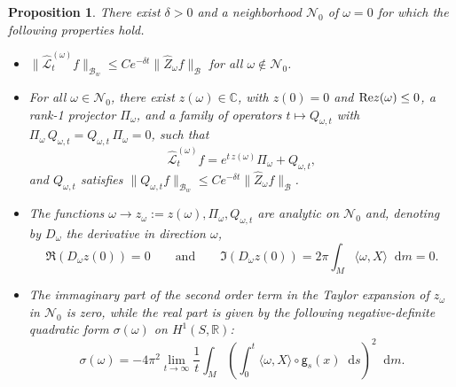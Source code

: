\documentclass[11pt,letterpaper]{amsart}
\newcommand \cL {{\mathcal L}}
\def\C{{\mathbb C}}
\newcommand \cB {{\mathscr B}}
\newcommand{\geo}{\mathsf{g}}
\newcommand*{\diff}{\mathop{}\!\mathrm{d}}
\newcommand \re {{%
\operatorname{Re}
}}
\newtheorem {proposition}[theorem]{Proposition}
\theoremstyle{definition}
\begin{document}
  \begin{proposition}\label{prop:pert2}
  	There exist $\delta > 0$ and a neighborhood $\mathcal N_0$ of $\omega=0$ for which the following properties hold.
  	\begin{itemize}
	\item[(A)] $\|\hat\cL^{(\omega)}_t f\|_{\cB_w} \leq C e^{-\delta t} \|\hat Z_{\omega} f\|_{\cB} $ for all $\omega \notin \mathcal N_0$.
	\item[(B)] For all $\omega \in \mathcal N_0$, there exist $z(\omega) \in \C$, with $z(0)=0$ and $\re z(\omega) \leq 0$, a rank-1 projector $\Pi_\omega$, and a family of operators $t\mapsto Q_{\omega,t}$ with $\Pi_\omega \, Q_{\omega,t} = Q_{\omega,t} \, \Pi_\omega = 0$, such that
	\[
	\hat\cL^{(\omega)}_t f = e^{t\, z(\omega)} \Pi_\omega + Q_{\omega,t},
	\]
	and $Q_{\omega,t}$ satisfies $\|Q_{\omega,t} f\|_{\cB_w} \leq C e^{-\delta t}\|\hat Z_{\omega} f\|_{\cB}$.
	\item[(C)] The functions $\omega \to z_\omega:=z(\omega),\Pi_\omega, Q_{\omega,t}$ are analytic on $\mathcal N_0$ and, denoting by $D_{\omega}$ the derivative in direction $\omega$,   
	\begin{equation}\label{eq:taylor}
		\Re(D_{\omega}z(0))=0 \qquad \text{and} \qquad \Im(D_{\omega}z(0))=2\pi \int_M \langle \omega, X \rangle \diff m=0.
	\end{equation}
\item[(D)]The immaginary part of the second order term in the Taylor expansion of $z_\omega$ in $\mathcal N_{0}$ is zero, while the real part is given by the following {negative}-definite quadratic form $\sigma(\omega)$ on $H^1(S, \mathbb{R})$:
\begin{equation}\label{eq:sigma}
	\sigma(\omega)={-4\pi^2} \lim_{t\to \infty}\frac 1t \int_M \left( \int_0^t \langle \omega, X \rangle\circ \geo_s(x) \diff s \right)^2 \diff m.
\end{equation}
  	\end{itemize}
  	\end{proposition}
\end{document}
